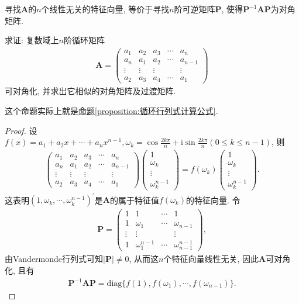 \documentclass[../../main.tex]{subfiles}
\begin{document}
寻找\(\boldsymbol{A}\)的\(n\)个线性无关的特征向量, 等价于寻找\(n\)阶可逆矩阵\(\boldsymbol{P}\), 使得\(\boldsymbol{P}^{-1}\boldsymbol{AP}\)为对角矩阵.

\begin{proposition}[循环矩阵一定可对角化]\label{proposition:循环矩阵一定可对角化}
求证: 复数域上\(n\)阶循环矩阵
\begin{align*}
\boldsymbol{A}=\begin{pmatrix}
a_{1}&a_{2}&a_{3}&\cdots&a_{n}\\
a_{n}&a_{1}&a_{2}&\cdots&a_{n - 1}\\
\vdots&\vdots&\vdots&&\vdots\\
a_{2}&a_{3}&a_{4}&\cdots&a_{1}
\end{pmatrix}
\end{align*}
可对角化, 并求出它相似的对角矩阵及过渡矩阵.
\end{proposition}
\begin{note}
这个命题实际上就是\hyperref[proposition:循环行列式计算公式]{命题\ref{proposition:循环行列式计算公式}}.
\end{note}
\begin{proof}
设\(f(x)=a_{1}+a_{2}x+\cdots+a_{n}x^{n - 1},\omega_{k}=\cos\frac{2k\pi}{n}+\mathrm{i}\sin\frac{2k\pi}{n}(0\leqslant  k\leqslant  n - 1)\), 则
\begin{align*}
\begin{pmatrix}
a_{1}&a_{2}&a_{3}&\cdots&a_{n}\\
a_{n}&a_{1}&a_{2}&\cdots&a_{n - 1}\\
\vdots&\vdots&\vdots&&\vdots\\
a_{2}&a_{3}&a_{4}&\cdots&a_{1}
\end{pmatrix}\begin{pmatrix}
1\\
\omega_{k}\\
\vdots\\
\omega_{k}^{n - 1}
\end{pmatrix}=f(\omega_{k})\begin{pmatrix}
1\\
\omega_{k}\\
\vdots\\
\omega_{k}^{n - 1}
\end{pmatrix}.
\end{align*}
这表明\((1,\omega_{k},\cdots,\omega_{k}^{n - 1})^{\prime}\)是\(\boldsymbol{A}\)的属于特征值\(f(\omega_{k})\)的特征向量. 令
\begin{align*}
\boldsymbol{P}=\begin{pmatrix}
1&1&\cdots&1\\
1&\omega_{1}&\cdots&\omega_{n - 1}\\
\vdots&\vdots&&\vdots\\
1&\omega_{1}^{n - 1}&\cdots&\omega_{n - 1}^{n - 1}
\end{pmatrix},
\end{align*}
由Vandermonde行列式可知\(\vert\boldsymbol{P}\vert\neq 0\), 从而这\(n\)个特征向量线性无关, 因此\(\boldsymbol{A}\)可对角化, 且有
\begin{align*}
\boldsymbol{P}^{-1}\boldsymbol{AP}=\mathrm{diag}\{f(1),f(\omega_{1}),\cdots,f(\omega_{n - 1})\}.
\end{align*} 
\end{proof}
\end{document}
